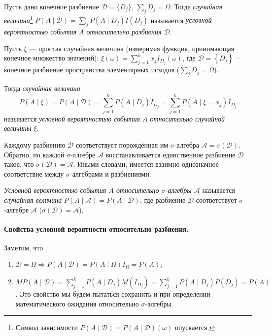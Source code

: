 \begin{definition}
  Пусть дано конечное разбиение $ \mathscr{D} = \{D_j\} $, $ \sum_j D_j = \Omega
  $. Тогда \textsl{случайная величина}\footnote{Символ зависимости $
  P(A\mid\mathscr{D}) = P(A\mid\mathscr{D})(\omega) $ опускается.} $ P(A \mid \mathscr{D}) = \sum_j P(A\mid
  D_j) I(D_j)$ называется \emph{условной вероятностью события $ A $ относительно
  разбиения $ \mathscr D $}.
\end{definition}

\begin{definition}
  Пусть $\xi$ --- простая случайная величина (измеримая функция, принимающая
  конечное множество значений):
  $\xi(\omega) = \sum\limits_{j=1}^k x_j I_{D_j}(\omega)$, где
  $\mathscr{D} = \left\{ D_j \right\} $ -- конечное разбиение пространства элементарных
  исходов ($\sum_j D_j = \Omega$).

Тогда \textsl{случайная величина}
\[
  P(A \mid \xi) = P(A \mid \mathscr D) = \sum\limits_{j=1}^k P(A\mid
  D_j) I_{D_j} = \sum_{j=1}^k P(A\mid \xi = x_j)I_{D_j}
\]
называется \emph{условной вероятностью события $ A $
    относительно случайной
  величины $ \xi $}.
\end{definition}

Каждому разбиению $ \mathscr D $ соответствует порождённая им $
\sigma $-алгебра $ \mathscr A = \sigma(\mathscr D) $. Обратно, по каждой $ \sigma
$-алгебре $ \mathscr A $
восстанавливается единственное разбиение $
\mathscr D$ такое, что $ \sigma(\mathscr D) = \mathscr A $. Иными словами,
имеется взаимно однозначное соответствие между $ \sigma $-алгебрами и
разбиениями.

\begin{definition}
  \emph{Условной вероятностью события $ A $ относительно $ \sigma $-алгебры $
  \mathscr A $} называется \textsl{случайная величина} $ P(A\mid \mathscr A) =
  P(A\mid \mathscr{D}) $, где разбиение $ \mathscr{D} $ соответствует $ \sigma
  $-алгебре $ \mathscr A $ ($ \sigma(\mathscr D) = \mathscr A $).
\end{definition}

\paragraph{Свойства условной вероятности относительно разбиения.} Заметим, что
  \begin{enumerate}
    \item $\mathscr{D} = \Omega \Rightarrow P(A \mid \mathscr{D}) = P(A\mid \Omega) I_\Omega = P(A)$;
    \item $MP(A \mid \mathscr{D}) = \sum\limits_{j=1}^k P(A \mid D_j) M(I_{D_j}) =
      \sum\limits_{j=1}^k P(A\mid D_j) P(D_j) = P(A)$. 
      Это свойство мы будем пытаться
      сохранить и
      при определении математического ожидания относительно $\sigma$-алгебры.
  \end{enumerate}

